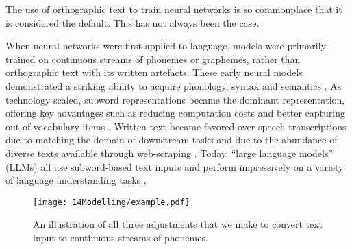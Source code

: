 
The use of orthographic text to train neural networks is so commonplace that it is considered the default. This has not always been the case.

When neural networks were first applied to language, models were primarily trained on continuous streams of phonemes or graphemes, rather than orthographic text with its written artefacts. These early neural models demonstrated a striking ability to acquire phonology, syntax and semantics \citep{elman-1990-finding, seidenberg-1989-word-recognition, prince-1997-optimality}. As technology scaled, subword representations became the dominant representation, offering key advantages such as reducing computation costs and better capturing out-of-vocabulary items \citep{sennrich-etal-2016-bpe}. Written text became favored over speech transcriptions due to matching the domain of downstream tasks and due to the abundance of diverse texts available through web-scraping \citep{bansal-2022-datascaling}. Today, ``large language models'' (LLMs) all use subword-based text inputs and perform impressively on a variety of language understanding tasks \citep{zellers-etal-2019-hellaswag, hendrycks-2020-mmlu, suzgun-2023-Big-Bench}.

\begin{figure}[t]
    \centering
    \texttt{[image: 14Modelling/example.pdf]}
    \caption{An illustration of all three adjustments that we make to convert text input to continuous streams of phonemes.}
    \label{fix:14-example}
    \vspace{-6mm}
\end{figure}



